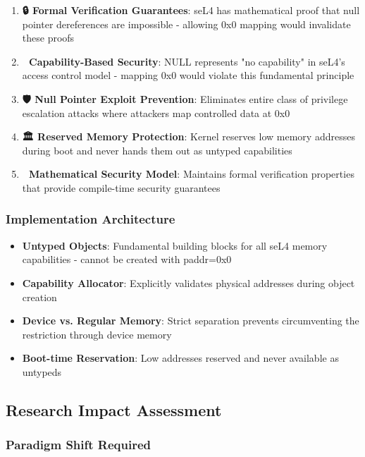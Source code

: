 \documentclass[11pt,a4paper]{article}
\begin{document}
\begin{enumerate}
    \item \textbf{🔒 Formal Verification Guarantees}: seL4 has mathematical proof that null pointer dereferences are impossible - allowing 0x0 mapping would invalidate these proofs
    \item \textbf{🔑 Capability-Based Security}: NULL represents "no capability" in seL4's access control model - mapping 0x0 would violate this fundamental principle
    \item \textbf{🛡️ Null Pointer Exploit Prevention}: Eliminates entire class of privilege escalation attacks where attackers map controlled data at 0x0
    \item \textbf{🏛️ Reserved Memory Protection}: Kernel reserves low memory addresses during boot and never hands them out as untyped capabilities
    \item \textbf{🧮 Mathematical Security Model}: Maintains formal verification properties that provide compile-time security guarantees
\end{enumerate}

\subsubsection{Implementation Architecture}

\begin{itemize}
    \item \textbf{Untyped Objects}: Fundamental building blocks for all seL4 memory capabilities - cannot be created with paddr=0x0
    \item \textbf{Capability Allocator}: Explicitly validates physical addresses during object creation
    \item \textbf{Device vs. Regular Memory}: Strict separation prevents circumventing the restriction through device memory
    \item \textbf{Boot-time Reservation}: Low addresses reserved and never available as untypeds
\end{itemize}

\subsection{Research Impact Assessment}

\subsubsection{Paradigm Shift Required}
\end{document}
